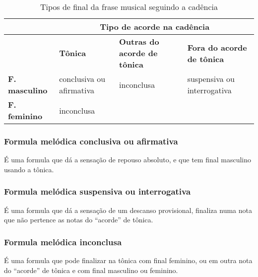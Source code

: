 \begin{table}[!h]
  \centering
  \begin{tabular}{|l||p{3cm}|p{2.5cm}|p{3.5cm}|}
  \hline
  ~                      &  \multicolumn{3}{c|}{\textbf{Tipo de acorde na cadência}} \\ \hline
  ~                      & \textbf{Tônica} & \textbf{Outras do acorde de tônica} & \textbf{Fora do acorde de tônica} \\ \hline \hline
  \textbf{F. masculino}  & conclusiva ou afirmativa  & inconclusa & suspensiva ou interrogativa  \\ \cline{1-2}
  \textbf{F. feminino}   & inconclusa                & ~ & ~   \\ \hline
  \end{tabular}  
  \caption{Tipos de final da frase musical seguindo a cadência}
  \label{tab:tablefinaltipo}
\end{table}

\subsubsection{Formula melódica conclusiva ou afirmativa}
É uma formula que dá a sensação de repouso absoluto,
e que tem final masculino  usando a tônica.

\subsubsection{Formula melódica suspensiva ou interrogativa}
É uma formula que dá a sensação de um descanso provisional,
finaliza numa nota que não pertence as notas do ``acorde'' de tônica. 

\subsubsection{Formula melódica inconclusa}
É uma formula que pode finalizar na tônica com final feminino, ou
em outra nota do ``acorde'' de tônica e com final masculino ou feminino.
